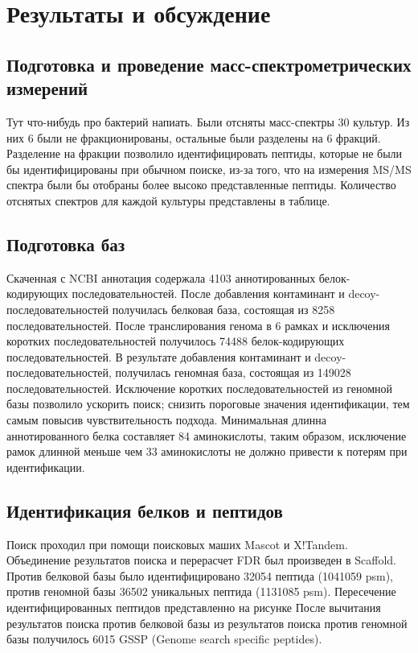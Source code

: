 \section{Результаты и обсуждение}

\subsection{Подготовка и проведение масс-спектрометрических измерений}
Тут что-нибудь про бактерий напиать.
Были отсняты масс-спектры 30 культур. Из них 6 были не фракционированы, остальные были разделены на 6 фракций. Разделение на фракции позволило идентифицировать пептиды, которые не были бы идентифицированы при обычном поиске, из-за того, что на измерения MS/MS спектра были бы отобраны более высоко представленные пептиды. Количество отснятых спектров для каждой культуры представлены в таблице.

\subsection{Подготовка баз}
Скаченная с NCBI аннотация содержала 4103 аннотированных белок-кодирующих последовательностей. После добавления контаминант и decoy-последовательностей получилась белковая база, состоящая из 8258 последовательностей. После транслирования генома в 6 рамках и исключения коротких последовательностей получилось 74488 белок-кодирующих последовательностей. В результате добавления контаминант и decoy-последовательностей, получилась геномная база, состоящая из 149028 последовательностей. Исключение коротких последовательностей из геномной базы позволило ускорить поиск; снизить пороговые значения идентификации, тем самым повысив чувствительность подхода. Минимальная длинна аннотированного белка  составляет 84 аминокислоты, таким образом, исключение рамок длинной меньше чем 33 аминокислоты не должно привести к потерям при идентификации.

\subsection{Идентификация белков и пептидов}
Поиск проходил при помощи поисковых маших Mascot и X!Tandem. Объединение результатов поиска и перерасчет FDR был произведен в Scaffold. Против белковой базы было идентифицировано 32054 пептида (1041059 psm), против геномной базы 36502 уникальных пептида (1131085 psm). Пересечение идентифицированных пептидов представленно на рисунке После вычитания результатов поиска против белковой базы из результатов поиска против геномной базы получилось 6015 GSSP (Genome search specific peptides).  
                                                


\newpage
